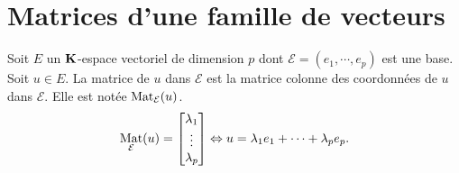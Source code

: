 

\section{Matrices d'une famille de vecteurs}
\begin{defi}
 Soit $E$ un $\mathbf{K}$-espace vectoriel de dimension $p$ dont $\mathcal E = (e_1,\cdots,e_p)$ est une base. Soit $u\in E$.  La matrice de $u$ dans $\mathcal E$ est la matrice colonne des coordonnées de $u$ dans $\mathcal E$. Elle est notée $\mathop{\mathrm{Mat}}_{\mathcal{E}}(u)$.
\[
 \mathop{\mathrm{Mat}}_{\mathcal E}(u)=\begin{bmatrix}
  \lambda_1\\
  \vdots\\
 \lambda_p
                      \end{bmatrix}
\Leftrightarrow
u = \lambda_1e_1+\cdots+\lambda_pe_p.
\]
\end{defi}

